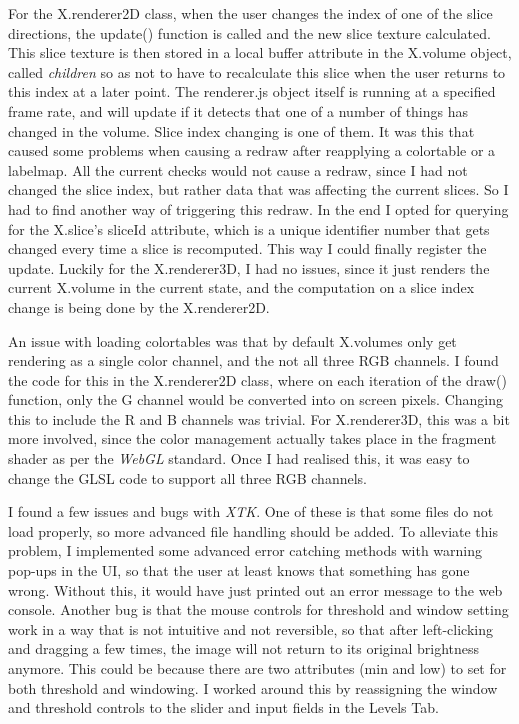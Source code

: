 \documentclass[a4paper,11pt,twoside]{article}
\begin{document}
For the X.renderer2D class, when the user changes the index of one of the slice directions, the update() function is called and the new slice texture calculated. This slice texture is then stored in a local buffer attribute in the X.volume object, called \textit{children} so as not to have to recalculate this slice when the user returns to this index at a later point. The renderer.js object itself is running at a specified frame rate, and will update if it detects that one of a number of things has changed in the volume. Slice index changing is one of them. It was this that caused some problems when causing a redraw after reapplying a colortable or a labelmap. All the current checks would not cause a redraw, since I had not changed the slice index, but rather data that was affecting the current slices. So I had to find another way of triggering this redraw. In the end I opted for querying for the X.slice's sliceId attribute, which is a unique identifier number that gets changed every time a slice is recomputed. This way I could finally register the update. Luckily for the X.renderer3D, I had no issues, since it just renders the current X.volume in the current state, and the computation on a slice index change is being done by the X.renderer2D.

An issue with loading colortables was that by default X.volumes only get rendering as a single color channel, and the not all three RGB channels. I found the code for this in the X.renderer2D class, where on each iteration of the draw() function, only the G channel would be converted into on screen pixels. Changing this to include the R and B channels was trivial. For X.renderer3D, this was a bit more involved, since the color management actually takes place in the fragment shader as per the \textit{WebGL} standard. Once I had realised this, it was easy to change the GLSL code to support all three RGB channels.

I found a few issues and bugs with \textit{XTK}. One of these is that some files do not load properly, so more advanced file handling should be added. To alleviate this problem, I implemented some advanced error catching methods with warning pop-ups in the UI, so that the user at least knows that something has gone wrong. Without this, it would have just printed out an error message to the web console. Another bug is that the mouse controls for threshold and window setting work in a way that is not intuitive and not reversible, so that after left-clicking and dragging a few times, the image will not return to its original brightness anymore. This could be because there are two attributes (min and low) to set for both threshold and windowing. I worked around this by reassigning the window and threshold controls to the slider and input fields in the Levels Tab.
\end{document}
